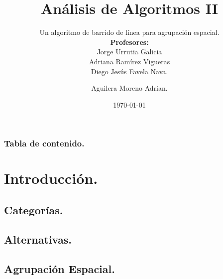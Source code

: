 \documentclass[9pt]{beamer}
\title{Análisis de Algoritmos II}
\subtitle{Un algoritmo de barrido de línea para agrupación espacial.\\
  \textbf{Profesores:}\\
  Jorge Urrutia Galicia\\
  Adriana Ramírez Vigueras\\
  Diego Jesús Favela Nava.}
\author{Aguilera Moreno Adrian.}
\institute{Facultad de Ciencias, UNAM}
\date{\today}
\begin{document}
\titlepage

\begin{frame}
 \frametitle{Tabla de contenido.}
 \tableofcontents
\end{frame}
%
\section{Introducción.}


\subsection{Categorías.}


\subsection{Alternativas.}


\subsection{Agrupación Espacial.}






\end{document}

